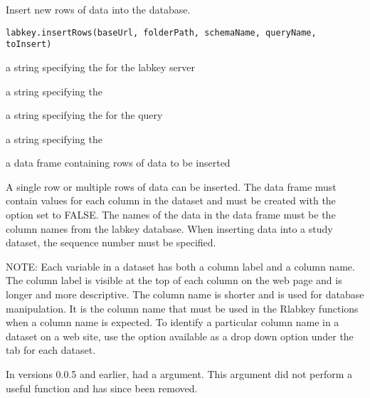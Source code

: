 \documentclass{book}
\begin{document}
\begin{Description}\relax
Insert new rows of data into the database.
\end{Description}
\begin{Usage}
\begin{verbatim}
labkey.insertRows(baseUrl, folderPath, schemaName, queryName, toInsert) 
\end{verbatim}
\end{Usage}
\begin{Arguments}
\begin{ldescription}
\item[\code{baseUrl}] a string specifying the for the labkey server
\item[\code{folderPath}] a string specifying the  
\item[\code{schemaName}] a string specifying the   for the query
\item[\code{queryName}] a string specifying the   
\item[\code{toInsert}] a data frame containing rows of data to be inserted
\end{ldescription}
\end{Arguments}
\begin{Details}\relax
A single row or multiple rows of data can be inserted.  The  data frame must contain
values for each column in the dataset and must be created with the  option
set to FALSE. The names of the data in the data frame must be the column names from the
labkey database. When inserting data into a study dataset, the sequence number must be specified.

NOTE: Each variable in a dataset has both a column label and a column name. The column label is visible at the top
of each column on the web page and is longer and more descriptive. The column name is shorter and is
used  for database manipulation. It is the column name that must be used in
the Rlabkey functions when a column name is expected. To identify a particular column name in a dataset on
a web site, use the  option available as a drop down option under the 
tab for each dataset.

In versions 0.0.5 and earlier,  had a  argument. This argument did not perform a useful function and has since been removed.
\end{Details}
\end{document}
